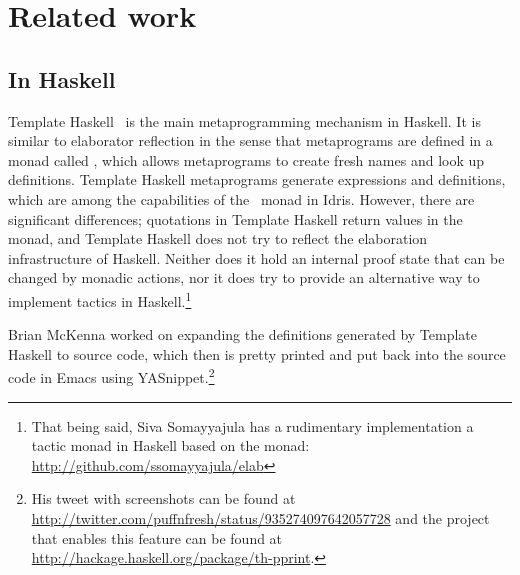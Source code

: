 \section{Related work} \label{sec:relatedwork}

\subsection{In Haskell}

Template Haskell~\cite{th} is the main metaprogramming mechanism in Haskell.
It is similar to elaborator reflection in the sense that metaprograms are
defined in a monad called , which allows metaprograms to create fresh
names and look up definitions.
Template Haskell metaprograms generate expressions and definitions, which are
among the capabilities of the \Elab\ monad in Idris.
However, there are significant differences;
quotations in Template Haskell return values in the  monad, and Template
Haskell does not try to reflect the elaboration infrastructure of
Haskell.
Neither does it hold an internal proof state that can be changed by monadic
actions, nor it does try to provide an alternative way to implement tactics in
Haskell.\footnote{That being said, Siva Somayyajula has a rudimentary
implementation a tactic monad in Haskell based on the  monad:
\url{http://github.com/ssomayyajula/elab}}

Brian McKenna worked on expanding the definitions generated by Template Haskell
to source code, which then is pretty printed and put back into the source code
in Emacs using YASnippet.\footnote{His tweet with screenshots can be found at
\url{http://twitter.com/puffnfresh/status/935274097642057728} and the project
that enables this feature can be found at
\url{http://hackage.haskell.org/package/th-pprint}.}


